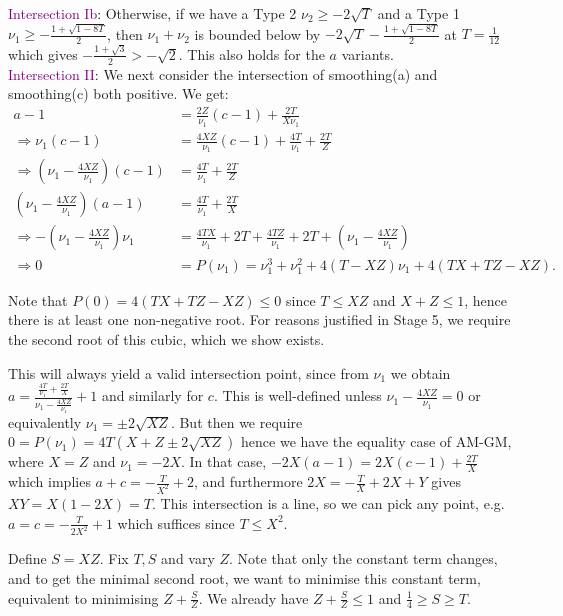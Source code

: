 \documentclass[11pt]{article}
\newcommand{\purp}[1]{\textcolor{purple}{#1}}
\begin{document}
\purp{Intersection Ib}: Otherwise, if we have a Type 2 $\nu_2 \ge -2\sqrt{T}$ and a Type 1 $\nu_1 \ge -\frac{1+\sqrt{1-8T}}{2}$, then $\nu_1 + \nu_2$ is bounded below by $-2\sqrt{T} - \frac{1+\sqrt{1-8T}}{2}$ at $T = \frac1{12}$ which gives $-\frac{1+\sqrt{3}}{2} > -\sqrt{2}$. This also holds for the $a$ variants. \\

\purp{Intersection II}: We next consider the intersection of smoothing(a) and smoothing(c) both positive. We get:
\begin{align*}
    a-1 &= \frac{2Z}{\nu_1} (c-1) + \frac{2T}{X\nu_1} \\
    \Rightarrow \nu_1(c-1) &= \frac{4XZ}{\nu_1} (c-1) + \frac{4T}{\nu_1} + \frac{2T}{Z} \\
    \Rightarrow \left(\nu_1 - \frac{4XZ}{\nu_1}\right)(c-1) &= \frac{4T}{\nu_1} + \frac{2T}{Z} \\
    \left(\nu_1 - \frac{4XZ}{\nu_1}\right)(a-1) &= \frac{4T}{\nu_1} + \frac{2T}{X} \\
    \Rightarrow -\left(\nu_1 - \frac{4XZ}{\nu_1}\right)\nu_1 &= \frac{4TX}{\nu_1} + 2T + \frac{4TZ}{\nu_1} + 2T + \left(\nu_1 - \frac{4XZ}{\nu_1}\right) \\
    \Rightarrow 0 &= P(\nu_1) = \nu_1^3 + \nu_1^2 + 4(T-XZ)\nu_1 + 4(TX + TZ - XZ).
\end{align*}

Note that $P(0) = 4(TX + TZ - XZ) \le 0$ since $T \le XZ$ and $X + Z \le 1$, hence there is at least one non-negative root. For reasons justified in Stage 5, we require the second root of this cubic, which we show exists. 

This will always yield a valid intersection point, since from $\nu_1$ we obtain $a = \frac{\frac{4T}{\nu_1} + \frac{2T}{X}}{\nu_1 - \frac{4XZ}{\nu_1}} + 1$ and similarly for $c$. This is well-defined unless $\nu_1 - \frac{4XZ}{\nu_1} = 0$ or equivalently $\nu_1 = \pm 2\sqrt{XZ}$. But then we require $0 = P(\nu_1) = 4T(X + Z \pm 2\sqrt{XZ})$ hence we have the equality case of AM-GM, where $X = Z$ and $\nu_1 = -2X$. In that case, $-2X(a-1) = 2X(c-1) + \frac{2T}{X}$ which implies $a + c = -\frac{T}{X^2} + 2$, and furthermore $2X = -\frac{T}{X} + 2X + Y$ gives $XY = X(1-2X) = T$. This intersection is a line, so we can pick any point, e.g. $a = c = -\frac{T}{2X^2} + 1$ which suffices since $T \le X^2$. 

Define $S = XZ$. Fix $T, S$ and vary $Z$. Note that only the constant term changes, and to get the minimal second root, we want to minimise this constant term, equivalent to minimising $Z + \frac{S}{Z}$. We already have $Z + \frac{S}{Z} \le 1$ and $\frac14 \ge S \ge T$. \\
\end{document}
